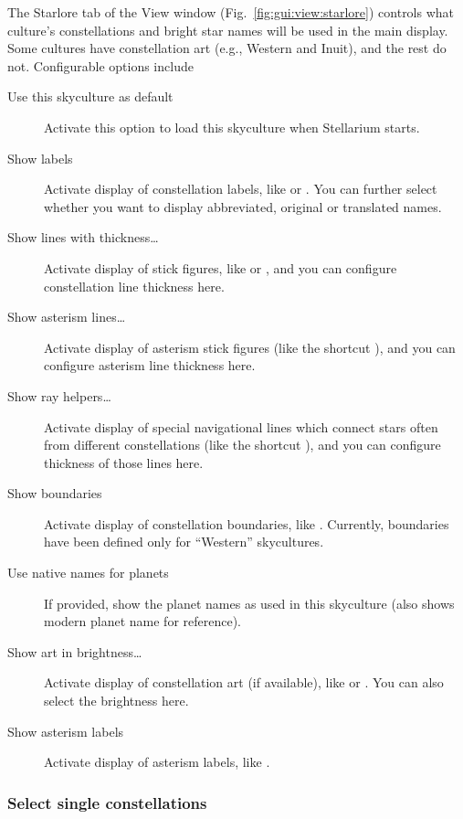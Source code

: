 The Starlore tab of the View window (Fig.~\ref{fig:gui:view:starlore})
controls what culture's constellations and bright star names will be
used in the main display.  Some cultures have constellation art (e.g.,
Western and Inuit), and the rest do not. Configurable options include
\begin{description}
\item[Use this skyculture as default] Activate this option to load
  this skyculture when Stellarium starts.
\item[Show labels] Activate display of constellation labels, like
   or . You can further
  select whether you want to display abbreviated, original or
  translated names.
\item[Show lines with thickness\ldots] Activate display of stick
  figures, like  or , and you
  can configure constellation line thickness here.
\item[Show asterism lines\ldots] Activate display of asterism stick figures   
  (like the shortcut ), and you can configure asterism line thickness here.
\item[Show ray helpers\ldots] Activate display of special navigational lines which 
 connect stars often from different constellations (like the shortcut ), and you can configure thickness of those lines here.
\item[Show boundaries] Activate display of constellation boundaries,
  like . Currently, boundaries have been defined only for
  ``Western'' skycultures.
\item[Use native names for planets] If provided, show the planet names
  as used in this skyculture (also shows modern planet name for
  reference). %
\item[Show art in brightness\ldots] Activate display of constellation
  art (if available), like  or
  . You can also select the brightness here.
\item[Show asterism labels] Activate display of asterism labels, like .
\end{description}

\subsubsection{Select single constellations}
\label{sec:starlore:singleConstellations}

